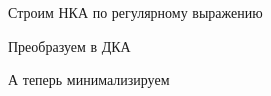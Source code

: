 \documentclass{article}
\begin{document}
\begin{enumerate}
    Строим НКА по регулярному выражению
    \begin{center}
            \begin{figure}[htbp]
                \centering
                
            \end{figure}
        \end{center}
    Преобразуем в ДКА 
     \begin{center}
            \begin{figure}[htbp]
                \centering
                
            \end{figure}
        \end{center}
    \newpage
    А теперь минимализируем      
    \begin{center}
            \begin{figure}[htbp]
                \centering
                
            \end{figure}
        \end{center}    
    
    \end{enumerate}
\end{document}
